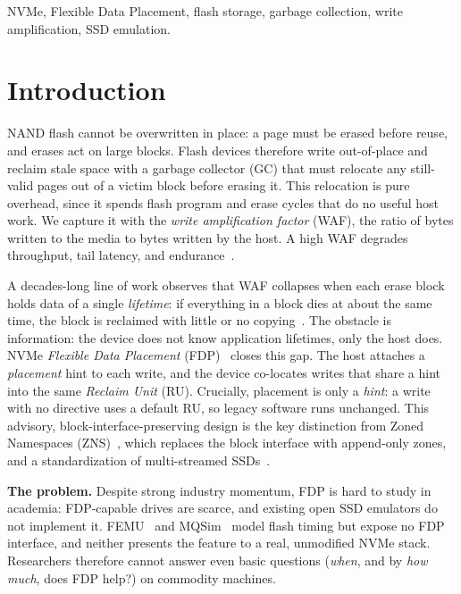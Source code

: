 \documentclass[conference,10pt]{IEEEtran}
\begin{document}
\begin{IEEEkeywords}
NVMe, Flexible Data Placement, flash storage, garbage collection, write
amplification, SSD emulation.
\end{IEEEkeywords}

\section{Introduction}
NAND flash cannot be overwritten in place: a page must be erased before reuse,
and erases act on large blocks. Flash devices therefore write out-of-place and
reclaim stale space with a garbage collector (GC) that must relocate any
still-valid pages out of a victim block before erasing it. This relocation is
pure overhead, since it spends flash program and erase cycles that do no useful
host work. We capture it with the \emph{write amplification factor} (WAF), the
ratio of bytes written to the media to bytes written by the host. A high WAF
degrades throughput, tail latency, and endurance~\cite{arpachiDusseau18:osbook}.

A decades-long line of work observes that WAF collapses when each erase block
holds data of a single \emph{lifetime}: if everything in a block dies at about
the same time, the block is reclaimed with little or no
copying~\cite{lifetime:hotcold,lfs:tocs92}. The obstacle is information: the
device does not know application lifetimes, only the host does. NVMe
\emph{Flexible Data Placement} (FDP)~\cite{fdp:tp4146} closes this gap. The host
attaches a \emph{placement} hint to each write, and the device co-locates writes
that share a hint into the same \emph{Reclaim Unit} (RU). Crucially, placement
is only a \emph{hint}: a write with no directive uses a default RU, so legacy
software runs unchanged. This advisory, block-interface-preserving design is the
key distinction from Zoned Namespaces (ZNS)~\cite{zns:atc21}, which replaces the
block interface with append-only zones, and a standardization of multi-streamed
SSDs~\cite{multistream:hotstorage14}.

\textbf{The problem.} Despite strong industry momentum, FDP is hard to study in
academia: FDP-capable drives are scarce, and existing open SSD emulators do not
implement it. FEMU~\cite{femu:fast18} and MQSim~\cite{mqsim:fast18} model flash
timing but expose no FDP interface, and neither presents the feature to a real,
unmodified NVMe stack. Researchers therefore cannot answer even basic questions
(\emph{when}, and by \emph{how much}, does FDP help?) on commodity machines.
\end{document}
